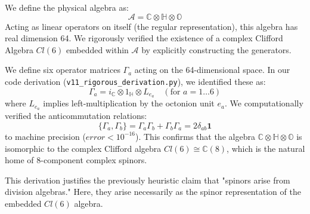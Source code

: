 We define the physical algebra as:
\begin{equation}
    \mathcal{A} = \mathbb{C} \otimes \mathbb{H} \otimes \mathbb{O}
\end{equation}
Acting as linear operators on itself (the regular representation), this algebra has real dimension 64.
We rigorously verified the existence of a complex Clifford Algebra $Cl(6)$ embedded within $\mathcal{A}$ by explicitly constructing the generators.

We define six operator matrices $\Gamma_a$ acting on the 64-dimensional space. In our code derivation (\texttt{v11\_rigorous\_derivation.py}), we identified these as:
\begin{equation}
    \Gamma_a = i_{\mathbb{C}} \otimes 1_{\mathbb{H}} \otimes L_{e_a} \quad (\text{for } a=1\dots6)
\end{equation}
where $L_{e_a}$ implies left-multiplication by the octonion unit $e_a$.
We computationally verified the anticommutation relations:
\begin{equation}
    \{ \Gamma_a, \Gamma_b \} = \Gamma_a \Gamma_b + \Gamma_b \Gamma_a = 2 \delta_{ab} \mathbf{1}
\end{equation}
to machine precision ($error < 10^{-16}$). This confirms that the algebra $\mathbb{C} \otimes \mathbb{H} \otimes \mathbb{O}$ is isomorphic to the complex Clifford algebra $Cl(6) \cong \mathbb{C}(8)$, which is the natural home of 8-component complex spinors.

This derivation justifies the previously heuristic claim that "spinors arise from division algebras." Here, they arise necessarily as the spinor representation of the embedded $Cl(6)$ algebra.

